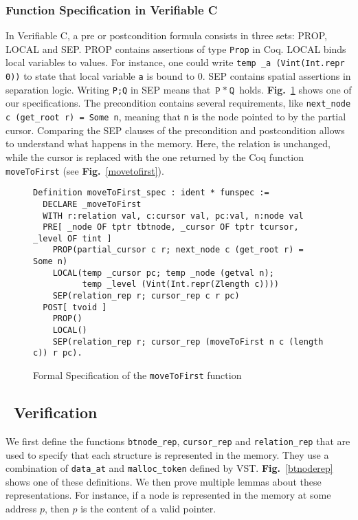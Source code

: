 \subsubsection{Function Specification in Verifiable C}
In Verifiable C, a pre or postcondition formula consists in three sets: PROP, LOCAL and SEP.
PROP contains assertions of type \texttt{Prop} in Coq.
LOCAL binds local variables to values. For instance, one could write \texttt{temp \_a (Vint(Int.repr 0))} to state that local variable \texttt{a} is bound to 0.
SEP contains spatial assertions in separation logic. Writing \texttt{P;Q} in SEP means that $\texttt{P}~*~\texttt{Q}$ holds.
\textbf{Fig.}~\ref{spec} shows one of our specifications.
The precondition contains several requirements, like \texttt{next\_node c (get\_root r) = Some n}, meaning that \texttt{n} is the node pointed to by the partial cursor.
Comparing the SEP clauses of the precondition and postcondition allows to understand what happens in the memory.
Here, the relation is unchanged, while the cursor is replaced with the one returned by the Coq function \texttt{moveToFirst} (see \textbf{Fig.}~\ref{movetofirst}).

\begin{figure}
\begin{lstlisting}[language=Coq]
Definition moveToFirst_spec : ident * funspec :=
  DECLARE _moveToFirst
  WITH r:relation val, c:cursor val, pc:val, n:node val
  PRE[ _node OF tptr tbtnode, _cursor OF tptr tcursor, _level OF tint ]
    PROP(partial_cursor c r; next_node c (get_root r) = Some n)
    LOCAL(temp _cursor pc; temp _node (getval n);
          temp _level (Vint(Int.repr(Zlength c))))
    SEP(relation_rep r; cursor_rep c r pc)
  POST[ tvoid ]
    PROP()
    LOCAL()
    SEP(relation_rep r; cursor_rep (moveToFirst n c (length c)) r pc).
\end{lstlisting}
\caption{Formal Specification of the \texttt{moveToFirst} function}
\label{spec}
\end{figure}



\subsection{\btrees\ Verification}
We first define the functions \texttt{btnode\_rep}, \texttt{cursor\_rep} and \texttt{relation\_rep} that are used to specify that each structure is represented in the memory.
They use a combination of \texttt{data\_at} and \texttt{malloc\_token} defined by VST.
\textbf{Fig.}~\ref{btnoderep} shows one of these definitions.
We then prove multiple lemmas about these representations. For instance, if a node is represented in the memory at some address $p$, then $p$ is the content of a valid pointer.

